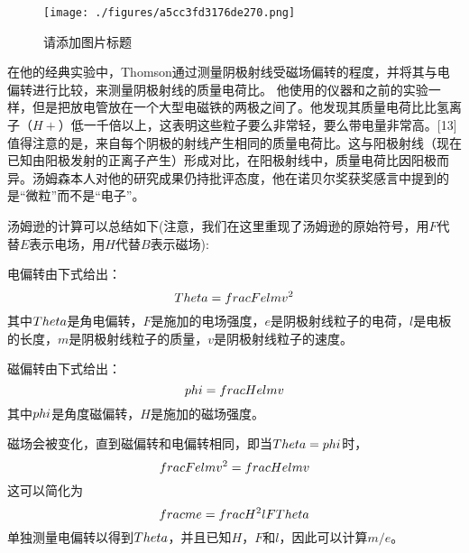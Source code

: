 \begin{figure}[ht]
\centering
\texttt{[image: ./figures/a5cc3fd3176de270.png]}
\caption{请添加图片标题} \label{fig_Joseph_5}
\end{figure}
在他的经典实验中，Thomson通过测量阴极射线受磁场偏转的程度，并将其与电偏转进行比较，来测量阴极射线的质量电荷比。 他使用的仪器和之前的实验一样，但是把放电管放在一个大型电磁铁的两极之间了。他发现其质量电荷比比氢离子（$H+$）低一千倍以上，这表明这些粒子要么非常轻，要么带电量非常高。[13] 值得注意的是，来自每个阴极的射线产生相同的质量电荷比。这与阳极射线（现在已知由阳极发射的正离子产生）形成对比，在阳极射线中，质量电荷比因阳极而异。汤姆森本人对他的研究成果仍持批评态度，他在诺贝尔奖获奖感言中提到的是“微粒”而不是“电子”。

汤姆逊的计算可以总结如下(注意，我们在这里重现了汤姆逊的原始符号，用$F$代替$E$表示电场，用$H$代替$B$表示磁场):

电偏转由下式给出：
$$\\Theta = \\frac{Fel}{mv^2}$$
其中$\\Theta$是角电偏转，$F$是施加的电场强度，$e$是阴极射线粒子的电荷，$l$是电板的长度，$m$是阴极射线粒子的质量，$v$是阴极射线粒子的速度。

磁偏转由下式给出：
$$\\phi = \\frac{Hel}{mv}$$
其中$\\phi$是角度磁偏转，$H$是施加的磁场强度。

磁场会被变化，直到磁偏转和电偏转相同，即当$\\Theta = \\phi$时，
$$\\frac{Fel}{mv^2} = \\frac{Hel}{mv}$$
这可以简化为
$$\\frac{m}{e} = \\frac{H^2 l}{F \\Theta}$$
单独测量电偏转以得到$\\Theta$，并且已知$H$，$F$和$l$，因此可以计算$m / e$。
